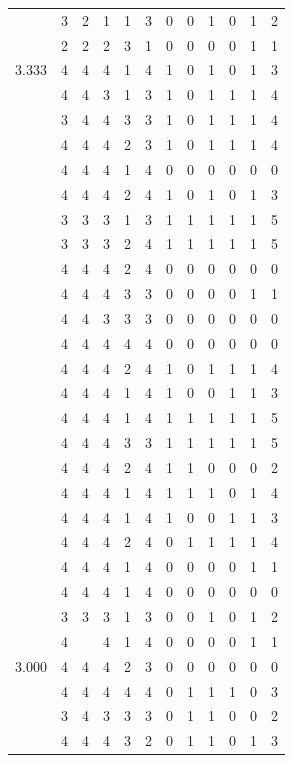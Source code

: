 \documentclass[]{msu-thesis}
\theoremstyle{definition}
\theoremstyle{definition}
\theoremstyle{definition}
\theoremstyle{remark}
\begin{document}
\begin{table}
{\begin{tabular}[t]{rrrrrrrrrrrr}
 & 3 & 2 & 1 & 1 & 3 & 0 & 0 & 1 & 0 & 1 & 2\\
 & 2 & 2 & 2 & 3 & 1 & 0 & 0 & 0 & 0 & 1 & 1\\
3.333 & 4 & 4 & 4 & 1 & 4 & 1 & 0 & 1 & 0 & 1 & 3\\
 & 4 & 4 & 3 & 1 & 3 & 1 & 0 & 1 & 1 & 1 & 4\\
 & 3 & 4 & 4 & 3 & 3 & 1 & 0 & 1 & 1 & 1 & 4\\
 & 4 & 4 & 4 & 2 & 3 & 1 & 0 & 1 & 1 & 1 & 4\\
 & 4 & 4 & 4 & 1 & 4 & 0 & 0 & 0 & 0 & 0 & 0\\
 & 4 & 4 & 4 & 2 & 4 & 1 & 0 & 1 & 0 & 1 & 3\\
 & 3 & 3 & 3 & 1 & 3 & 1 & 1 & 1 & 1 & 1 & 5\\
 & 3 & 3 & 3 & 2 & 4 & 1 & 1 & 1 & 1 & 1 & 5\\
 & 4 & 4 & 4 & 2 & 4 & 0 & 0 & 0 & 0 & 0 & 0\\
 & 4 & 4 & 4 & 3 & 3 & 0 & 0 & 0 & 0 & 1 & 1\\
 & 4 & 4 & 3 & 3 & 3 & 0 & 0 & 0 & 0 & 0 & 0\\
 & 4 & 4 & 4 & 4 & 4 & 0 & 0 & 0 & 0 & 0 & 0\\
 & 4 & 4 & 4 & 2 & 4 & 1 & 0 & 1 & 1 & 1 & 4\\
 & 4 & 4 & 4 & 1 & 4 & 1 & 0 & 0 & 1 & 1 & 3\\
 & 4 & 4 & 4 & 1 & 4 & 1 & 1 & 1 & 1 & 1 & 5\\
 & 4 & 4 & 4 & 3 & 3 & 1 & 1 & 1 & 1 & 1 & 5\\
 & 4 & 4 & 4 & 2 & 4 & 1 & 1 & 0 & 0 & 0 & 2\\
 & 4 & 4 & 4 & 1 & 4 & 1 & 1 & 1 & 0 & 1 & 4\\
 & 4 & 4 & 4 & 1 & 4 & 1 & 0 & 0 & 1 & 1 & 3\\
 & 4 & 4 & 4 & 2 & 4 & 0 & 1 & 1 & 1 & 1 & 4\\
 & 4 & 4 & 4 & 1 & 4 & 0 & 0 & 0 & 0 & 1 & 1\\
 & 4 & 4 & 4 & 1 & 4 & 0 & 0 & 0 & 0 & 0 & 0\\
 & 3 & 3 & 3 & 1 & 3 & 0 & 0 & 1 & 0 & 1 & 2\\
 & 4 &  & 4 & 1 & 4 & 0 & 0 & 0 & 0 & 1 & 1\\
3.000 & 4 & 4 & 4 & 2 & 3 & 0 & 0 & 0 & 0 & 0 & 0\\
 & 4 & 4 & 4 & 4 & 4 & 0 & 1 & 1 & 1 & 0 & 3\\
 & 3 & 4 & 3 & 3 & 3 & 0 & 1 & 1 & 0 & 0 & 2\\
 & 4 & 4 & 4 & 3 & 2 & 0 & 1 & 1 & 0 & 1 & 3\\

\end{tabular}}
\end{table}
\end{document}
